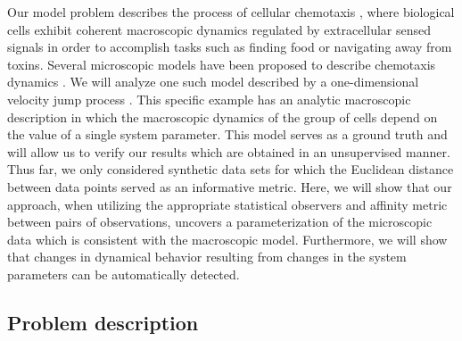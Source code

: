 \documentclass[3p]{elsarticle}
\begin{document}
Our model problem describes the process of cellular chemotaxis \cite{othmer2000diffusion}, where biological cells exhibit coherent macroscopic dynamics regulated by extracellular sensed signals in order to accomplish tasks such as finding food or navigating away from toxins.
%
Several microscopic models have been proposed to describe chemotaxis dynamics \cite{othmer1988models, codling2008random}.
%
We will analyze one such model described by a one-dimensional velocity jump process \cite{othmer2000diffusion}.
%
This specific example has an analytic macroscopic description in which the macroscopic dynamics of the group of cells depend on the value of a single system parameter.
%
This model serves as a ground truth and will allow us to verify our results which are obtained in an unsupervised manner.
%
Thus far, we only considered synthetic data sets for which the Euclidean distance between data points served as an informative metric. 
%
Here, we will show that our approach, when utilizing the appropriate statistical observers and affinity metric between pairs of observations, uncovers a parameterization of the microscopic data which is consistent with the macroscopic model.
%
Furthermore, we will show that changes in dynamical behavior resulting from changes in the system parameters can be automatically detected. 

\subsection{Problem description}
\end{document}
